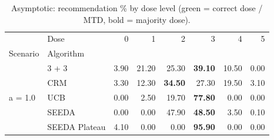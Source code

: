 \begin{table}[H]
\centering
\caption{Asymptotic: recommendation \% by dose level (green = correct dose / MTD, bold = majority dose).}
\label{tab:asym_rec_by_dose}
\begin{tabular}{llrrrrrr}
\toprule
 & Dose & 0 & 1 & 2 & 3 & 4 & 5 \\
Scenario & Algorithm &  &  &  &  &  &  \\
\midrule
\multirow[c]{5}{*}{a = 1.0} & 3 + 3 & 3.90 & 21.20 & {\cellcolor[HTML]{C8E6C9}} 25.30 & \bfseries 39.10 & 10.50 & 0.00 \\
 & CRM & 3.30 & 12.30 & {\cellcolor[HTML]{C8E6C9}} \bfseries 34.50 & 27.30 & 19.50 & 3.10 \\
 & UCB & 0.00 & 2.50 & {\cellcolor[HTML]{C8E6C9}} 19.70 & \bfseries 77.80 & 0.00 & 0.00 \\
 & SEEDA & 0.00 & 0.00 & {\cellcolor[HTML]{C8E6C9}} 47.90 & \bfseries 48.50 & 3.50 & 0.10 \\
 & SEEDA Plateau & 4.10 & 0.00 & {\cellcolor[HTML]{C8E6C9}} 0.00 & \bfseries 95.90 & 0.00 & 0.00 \\
\bottomrule
\end{tabular}
\end{table}

